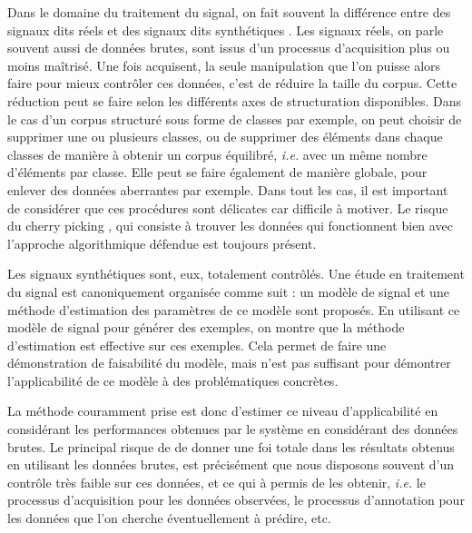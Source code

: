   Dans le domaine du traitement du signal, on fait souvent la différence entre des signaux dits \og réels \fg et des signaux dits \og synthétiques \fg. Les signaux réels, on parle souvent aussi de données brutes, sont issus d'un processus d'acquisition plus ou moins maîtrisé. Une fois acquisent, la seule manipulation que l'on puisse alors faire pour mieux contrôler ces données, c'est de réduire la taille du corpus. Cette réduction peut se faire selon les différents axes de structuration disponibles. Dans le cas d'un corpus structuré sous forme de classes par exemple, on peut choisir de supprimer une ou plusieurs classes, ou de supprimer des éléments dans chaque classes de manière à obtenir un corpus équilibré, \textit{i.e.} avec un même nombre d'éléments par classe. Elle peut se faire également de manière globale, pour enlever des données aberrantes par exemple. Dans tout les cas, il est important de considérer que ces procédures sont délicates car difficile à motiver. Le risque du \og cherry picking \fg, qui consiste à trouver les données qui fonctionnent bien avec l'approche algorithmique défendue est toujours présent.


  Les signaux synthétiques sont, eux, totalement contrôlés. Une étude en traitement du signal est canoniquement organisée comme suit : un modèle de signal et une méthode d'estimation des paramètres de ce modèle sont proposés. En utilisant ce modèle de signal pour générer des exemples, on montre que la méthode d'estimation est effective sur ces exemples. Cela permet de faire une démonstration de faisabilité du modèle, mais n'est pas suffisant pour démontrer l'applicabilité de ce modèle à des problématiques concrètes.

  La méthode couramment prise est donc d'estimer ce niveau d'applicabilité en considérant les performances obtenues par le système en considérant des données brutes. Le principal risque de de donner une foi totale dans les résultats obtenus en utilisant les données brutes, est précisément que nous disposons souvent d'un contrôle très faible sur ces données, et ce qui à permis de les obtenir, \textit{i.e.} le processus d'acquisition pour les données observées, le processus d'annotation pour les données que l'on cherche éventuellement à prédire, etc.


